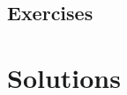 \documentclass[twoside]{book}\usepackage[]{graphicx}\usepackage[]{xcolor}
\newif\ifsolutions
\newif\ifsolutionslocal
\begin{document}
\newpage
\section*{Exercises}
\shipoutProblems


\ifsolutions
\ifsolutionslocal
\newpage
\section*{Solutions}
\shipoutSolutions
\fi
\fi
 
 

\backmatter




\printindex

\ifsolutions
\ifsolutionslocal\relax
\else
\newpage
\chapter*{Solutions}
\shipoutSolutions
\fi
\fi
\end{document}

